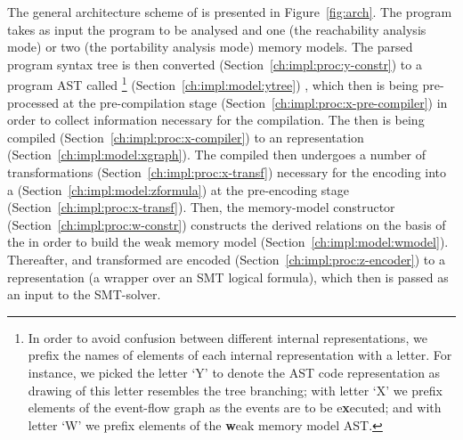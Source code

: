 The general architecture scheme of \porthos[2] is presented in Figure~\ref{fig:arch}.
The program takes as input the program to be analysed and one (the reachability analysis mode) or two (the portability analysis mode) memory models. The parsed program syntax tree is then converted (Section~\ref{ch:impl:proc:y-constr}) to a program AST called \ytree%
\footnote{In order to avoid confusion between different internal representations, we prefix the names of elements of each internal representation with a letter. For instance, we picked the letter `Y' to denote the AST code representation as drawing of this letter resembles the tree branching; with letter `X' we prefix elements of the event-flow graph as the events are to be e\textbf{x}ecuted; and with letter `W' we prefix elements of the \textbf{w}eak memory model AST.} %
(Section~\ref{ch:impl:model:ytree})
, which then is being pre-processed at the pre-compilation stage (Section~\ref{ch:impl:proc:x-pre-compiler}) in order to collect information necessary for the compilation.
The \ytree then is being compiled (Section~\ref{ch:impl:proc:x-compiler}) to an \xgraph representation (Section~\ref{ch:impl:model:xgraph}).
The compiled \xgraph then undergoes a number of transformations (Section~\ref{ch:impl:proc:x-transf}) necessary for the encoding into a \zformula (Section~\ref{ch:impl:model:zformula}) at the pre-encoding stage (Section~\ref{ch:impl:proc:x-transf}).
Then, the memory-model constructor (Section~\ref{ch:impl:proc:w-constr}) constructs the derived relations on the basis of the \xgraph in order to build the weak memory model \wmodel (Section~\ref{ch:impl:model:wmodel}).
Thereafter, \wmodel and transformed \xgraph are encoded (Section~\ref{ch:impl:proc:z-encoder}) to a \zformula representation (a wrapper over an SMT logical formula), which then is passed as an input to the SMT-solver.

